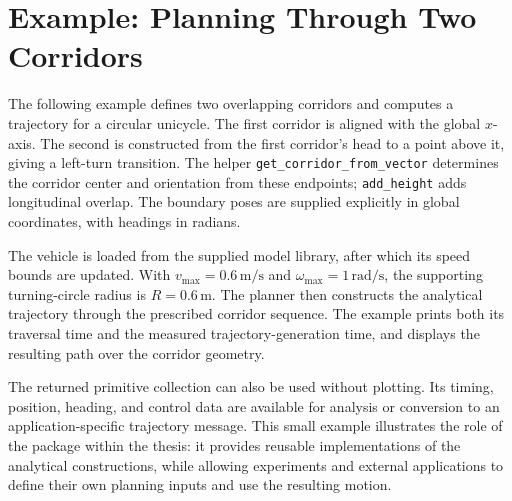 \section{Example: Planning Through Two Corridors}
\label{sec:kappa-example}

The following example defines two overlapping corridors and computes a
trajectory for a circular unicycle. The first corridor is aligned with the
global $x$-axis. The second is constructed from the first corridor's head to a
point above it, giving a left-turn transition. The helper
\texttt{get\_corridor\_from\_vector} determines the corridor center and
orientation from these endpoints; \texttt{add\_height} adds longitudinal overlap.
The boundary poses are supplied explicitly in global coordinates, with headings
in radians.



The vehicle is loaded from the supplied model library, after which its speed
bounds are updated. With $v_{\max}=0.6\,\mathrm{m/s}$ and
$\omega_{\max}=1\,\mathrm{rad/s}$, the supporting turning-circle radius is
$R=0.6\,\mathrm{m}$. The planner then constructs the analytical trajectory
through the prescribed corridor sequence. The example prints both its traversal
time and the measured trajectory-generation time, and displays the resulting
path over the corridor geometry.

The returned primitive collection can also be used without plotting. Its timing,
position, heading, and control data are available for analysis or conversion to
an application-specific trajectory message. This small example illustrates the
role of the package within the thesis: it provides reusable implementations of
the analytical constructions, while allowing experiments and external
applications to define their own planning inputs and use the resulting motion.
